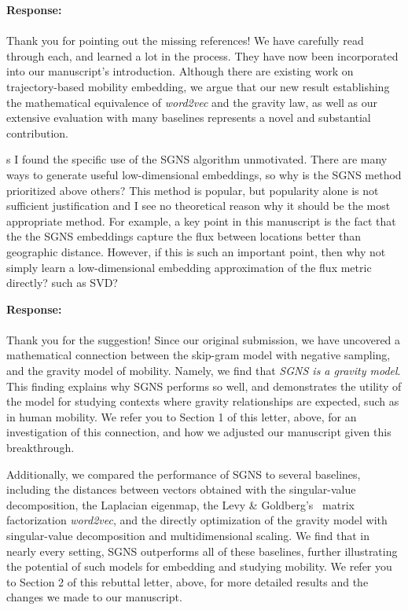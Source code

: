 \documentclass[12pt,a4paper]{article}
\newcounter{comment}[subsection]
\newcommand{\response}[1]{{\noindent \textbf{Response:} \\ \\ \noindent #1}}
\newcommand{\rcomment}[1]{%
\vspace{10pt}
\begin{sectionbox}
s #1
\end{sectionbox}
}
\begin{document}
\response{Thank you for pointing out the missing references!
	We have carefully read through each, and learned a lot in the process.
	They have now been incorporated into our manuscript's introduction.
	Although there are existing work on trajectory-based mobility embedding, we argue that our new result establishing the mathematical equivalence of \textit{word2vec} and the gravity law, as well as our extensive evaluation with many baselines represents a novel and substantial contribution.
}

\rcomment{
	I found the specific use of the SGNS algorithm unmotivated. There are many ways to generate useful low-dimensional embeddings, so why is the SGNS method prioritized above others? This method is popular, but popularity alone is not sufficient justification and I see no theoretical reason why it should be the most appropriate method. For example, a key point in this manuscript is the fact that the the SGNS embeddings capture the flux between locations better than geographic distance. However, if this is such an important point, then why not simply learn a low-dimensional embedding approximation of the flux metric directly? such as SVD?
}

\response{
	Thank you for the suggestion!
	Since our original submission, we have uncovered a mathematical connection between the skip-gram model with negative sampling, and the gravity model of mobility.
	Namely, we find that \emph{SGNS is a gravity model}.
	This finding explains why SGNS performs so well, and demonstrates the utility of the model for studying contexts where gravity relationships are expected, such as in human mobility.
	We refer you to Section 1 of this letter, above, for an investigation of this connection, and how we adjusted our manuscript given this breakthrough.

	Additionally, we compared the performance of SGNS to several baselines, including the distances between vectors obtained with the singular-value decomposition, the Laplacian eigenmap, the Levy
	\& Goldberg's~\autocite{levy2014neural} matrix factorization \textit{word2vec}, and the directly optimization of the gravity model with singular-value decomposition and multidimensional scaling.
	We find that in nearly every setting, SGNS outperforms all of these baselines, further illustrating the potential of such models for embedding and studying mobility.
	We refer you to Section 2 of this rebuttal letter, above, for more detailed results and the changes we made to our manuscript.
}
\end{document}
